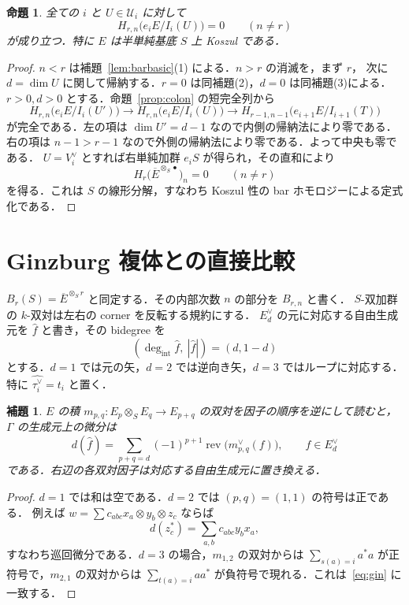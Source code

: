 \documentclass[a4paper,11pt]{ltjsarticle}
\newtheorem{lemma}[theorem]{補題}
\newtheorem{proposition}[theorem]{命題}
\theoremstyle{definition}
\newcommand{\dual}{^{\vee}}
\newcommand{\barE}{\overline E}
\newcommand{\cU}{\mathcal U}
\begin{document}
\begin{proposition}\label{prop:linear}
全ての $i$ と $U\in\cU_i$ に対して
\begin{equation}\label{eq:linear}
 H_{r,n}\bigl(e_iE/I_i(U)\bigr)=0\qquad(n\ne r)
\end{equation}
が成り立つ．特に $E$ は半単純基底 $S$ 上 Koszul である．
\end{proposition}
\begin{proof}
$n<r$ は補題~\ref{lem:barbasic}(1) による．$n>r$ の消滅を，まず $r$，
次に $d=\dim U$ に関して帰納する．$r=0$ は同補題(2)，$d=0$ は同補題(3)による．
$r>0,d>0$ とする．命題~\ref{prop:colon} の短完全列から
\[
 H_{r,n}\bigl(e_iE/I_i(U')\bigr)
 \longrightarrow H_{r,n}\bigl(e_iE/I_i(U)\bigr)
 \longrightarrow H_{r-1,n-1}\bigl(e_{i+1}E/I_{i+1}(T)\bigr)
\]
が完全である．左の項は $\dim U'=d-1$ なので内側の帰納法により零である．
右の項は $n-1>r-1$ なので外側の帰納法により零である．よって中央も零である．
$U=V_i\dual$ とすれば右単純加群 $e_iS$ が得られ，その直和により
\begin{equation}\label{eq:diagonal}
 H_r\bigl(\barE^{\otimes_S\bullet}\bigr)_n=0\qquad(n\ne r)
\end{equation}
を得る．これは $S$ の線形分解，すなわち Koszul 性の bar ホモロジーによる定式化である．
\end{proof}

\section{Ginzburg 複体との直接比較}
$B_r(S)=\barE^{\otimes_S r}$ と同定する．その内部次数 $n$ の部分を $B_{r,n}$ と書く．
$S$-双加群の $k$-双対は左右の corner を反転する規約にする．
$E_d\dual$ の元に対応する自由生成元を $\widehat f$ と書き，その bidegree を
\[
 (\deg_{\mathrm{int}}\widehat f,\ |\widehat f|)=(d,1-d)
\]
とする．$d=1$ では元の矢，$d=2$ では逆向き矢，$d=3$ ではループに対応する．
特に $\widehat{\tau_i\dual}=t_i$ と置く．

\begin{lemma}\label{lem:gendiff}
$E$ の積 $m_{p,q}:E_p\otimes_SE_q\to E_{p+q}$ の双対を因子の順序を逆にして読むと，
$\Gamma$ の生成元上の微分は
\begin{equation}\label{eq:gendiff}
 d(\widehat f)=\sum_{p+q=d}(-1)^{p+1}
 \operatorname{rev}\bigl(m_{p,q}\dual(f)\bigr),\qquad f\in E_d\dual
\end{equation}
である．右辺の各双対因子は対応する自由生成元に置き換える．
\end{lemma}
\begin{proof}
$d=1$ では和は空である．$d=2$ では $(p,q)=(1,1)$ の符号は正である．
例えば $w=\sum c_{abc}x_a\otimes y_b\otimes z_c$ ならば
\[
 d(z_c^*)=\sum_{a,b}c_{abc}y_bx_a,
\]
すなわち巡回微分である．$d=3$ の場合，$m_{1,2}$ の双対からは
$\sum_{s(a)=i}a^*a$ が正符号で，$m_{2,1}$ の双対からは
$\sum_{t(a)=i}aa^*$ が負符号で現れる．これは~\eqref{eq:gin} に一致する．
\end{proof}
\end{document}
